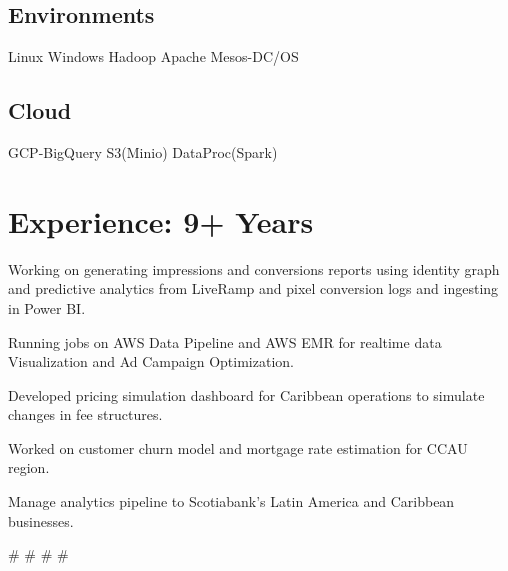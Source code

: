 \documentclass[]{Vishnu-Resume}
\begin{document}
\begin{minipage}[t]{0.33\textwidth}
\subsection{Environments}
Linux \textbullet{} Windows  \textbullet{} Hadoop \textbullet{} Apache Mesos-DC/OS

\subsection{Cloud}
GCP-BigQuery \textbullet{} S3(Minio) \textbullet{} DataProc(Spark)
%
%

\end{minipage} 
\hfill
\begin{minipage}[t]{0.66\textwidth} 


\section{Experience: 9+ Years}
\sectionsep
\sectionsep
\sectionsep
\sectionsep
\sectionsep
{}
\descript{}
\sectionsep
\sectionsep
\sectionsep
\sectionsep
\sectionsep
\sectionsep
\sectionsep
\sectionsep
\sectionsep
\sectionsep
\sectionsep
\sectionsep
\sectionsep
\sectionsep
\sectionsep
\begin{tightemize}
\item Working on generating impressions and conversions reports using identity graph and predictive analytics from LiveRamp and pixel conversion logs and ingesting in Power BI.
\item Running jobs on AWS Data Pipeline and AWS EMR for realtime data Visualization and Ad Campaign Optimization.
\end{tightemize}
\sectionsep
\sectionsep
\sectionsep
{}
\descript{}
\begin{tightemize}
\item Developed pricing simulation dashboard for Caribbean operations to simulate changes in fee structures.
\item Worked on customer churn model and mortgage rate estimation for CCAU region.
\item Manage analytics pipeline to Scotiabank's Latin America and Caribbean businesses.
\end{tightemize}
\#  \# \#  \#
\sectionsep


\end{minipage}
\end{document}
